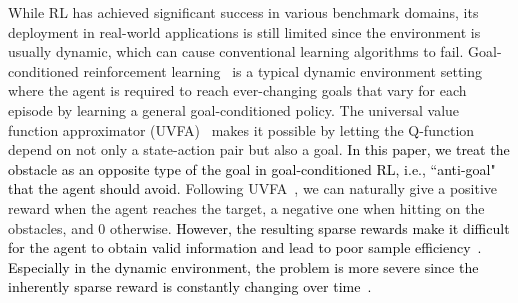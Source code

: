\documentclass[journal]{IEEEtran}
\begin{document}
While RL has achieved significant success in various benchmark domains, its deployment in real-world applications is still limited since the environment is usually dynamic, which can cause conventional learning algorithms to fail.
Goal-conditioned reinforcement learning~\citep{kaelbling1993learning, schaul2015universal, andrychowicz2017hindsight} is a typical dynamic environment setting where the agent is required to reach ever-changing goals that vary for each episode by learning a general goal-conditioned policy.
The universal value function approximator (UVFA)~\citep{schaul2015universal} makes it possible by letting the Q-function depend on not only a state-action pair but also a goal.
\textcolor{black}{In this paper, we treat the obstacle as an opposite type of the goal in goal-conditioned RL, i.e., ``anti-goal" that the agent should avoid.}
Following UVFA~\citep{schaul2015universal}, we can naturally give a positive reward when the agent reaches the target, a negative one when hitting on the obstacles, and 0 otherwise.
\textcolor{black}{However, the resulting sparse rewards make it difficult for the agent to obtain valid information and lead to poor sample efficiency~\citep{marom2018belief, dann2019deriving}.
Especially in the dynamic environment, the problem is more severe since the inherently sparse reward is constantly changing over time~\citep{andrychowicz2017hindsight}.}
\end{document}
